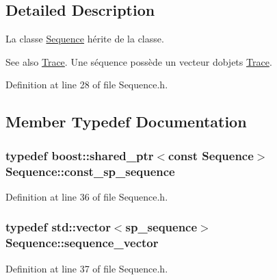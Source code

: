 \subsection{Detailed Description}
La classe \hyperlink{class_sequence}{Sequence} hérite de la classe. 

\begin{DoxySeeAlso}{See also}
\hyperlink{class_trace}{Trace}. Une séquence possède un vecteur d\textquotesingle{}objets \hyperlink{class_trace}{Trace}. 
\end{DoxySeeAlso}


Definition at line 28 of file Sequence.\+h.



\subsection{Member Typedef Documentation}
\subsubsection[{\texorpdfstring{const\+\_\+sp\+\_\+sequence}{const_sp_sequence}}]{\setlength{\rightskip}{0pt plus 5cm}typedef boost\+::shared\+\_\+ptr$<$const {\bf Sequence}$>$ {\bf Sequence\+::const\+\_\+sp\+\_\+sequence}}\hypertarget{class_sequence_ad2a8856e4c26f405a86b0cb9683c25ed}{}\label{class_sequence_ad2a8856e4c26f405a86b0cb9683c25ed}


Definition at line 36 of file Sequence.\+h.

\subsubsection[{\texorpdfstring{sequence\+\_\+vector}{sequence_vector}}]{\setlength{\rightskip}{0pt plus 5cm}typedef std\+::vector$<${\bf sp\+\_\+sequence}$>$ {\bf Sequence\+::sequence\+\_\+vector}}\hypertarget{class_sequence_a4487def8096371d361c6099c2d46dd13}{}\label{class_sequence_a4487def8096371d361c6099c2d46dd13}


Definition at line 37 of file Sequence.\+h.

